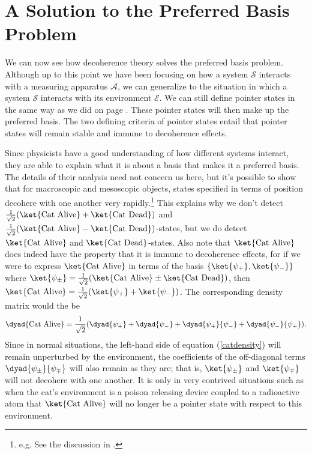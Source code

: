     \section{\label{sectionPreferredBasis}A Solution to the Preferred Basis Problem\protect\footnotemark}
    We can now see how decoherence theory solves the preferred basis problem. Although up to this point we have been focusing on how a system $\mathcal{S}$ interacts with a measuring apparatus $\mathcal{A}$, we can generalize to the situation in which a system $\mathcal{S}$ interacts with its environment $\mathcal{E}$. We can still define pointer states in the same way as we did on page \pageref{pointer}. These pointer states will then make up the preferred basis. The two defining criteria of pointer states entail that pointer states will remain stable and immune to decoherence effects. 
    
    Since physicists have a good understanding of how different systems interact, they are able to explain what it is about a basis that makes it a preferred basis.  The details of their analysis need not concern us here, but it's possible to show that for macroscopic and mesoscopic objects, states specified in terms of position decohere with one another very rapidly.\footnote{e.g. See the discussion in \cite[94]{Schlosshauer}.} This explains why we don't detect $\frac{1}{\sqrt{2}}(\ket{\text{Cat Alive}}+\ket{\text{Cat Dead}})$ and $\frac{1}{\sqrt{2}}(\ket{\text{Cat Alive}}-\ket{\text{Cat Dead}})$-states, but we do detect $\ket{\text{Cat Alive}}$ and $\ket{\text{Cat Dead}}$-states. Also note that $\ket{\text{Cat Alive}}$  does indeed have the property that it is immune to decoherence effects, for if we were to express $\ket{\text{Cat Alive}}$ in terms of the basis $\{\ket{\psi_+},\ket{\psi_-} \}$ where $\ket{\psi_\pm}=\frac{1}{\sqrt{2}}(\ket{\text{Cat Alive}}\pm\ket{\text{Cat Dead}})$, then $\ket{\text{Cat Alive}}=\frac{1}{\sqrt{2}}(\ket{\psi_+}+\ket{\psi_-})$. The corresponding density matrix would the be 
    \begin{equation}\label{catdensity}\dyad{\text{Cat Alive}}=\frac{1}{\sqrt{2}}(\dyad{\psi_+}+\dyad{\psi_-}+\dyad{\psi_+}{\psi_-}+\dyad{\psi_-}{\psi_+}).
    \end{equation} Since in normal situations, the left-hand side of equation (\ref{catdensity}) will remain unperturbed by the environment, the coefficients of the off-diagonal terms $\dyad{\psi_\pm}{\psi_\mp}$ will also remain as they are; that is, $\ket{\psi_\pm}$ and $\ket{\psi_\mp}$ will not decohere with one another. It is only in very contrived situations such as when the cat's environment is a poison releasing device coupled to a radioactive atom that $\ket{\text{Cat Alive}}$ will no longer be a pointer state with respect to this environment.  
   